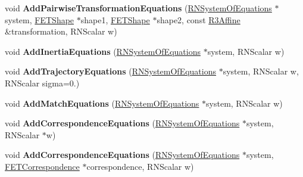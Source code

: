 \begin{DoxyCompactItemize}
\item 
void {\bfseries Add\+Pairwise\+Transformation\+Equations} (\hyperlink{class_r_n_system_of_equations}{R\+N\+System\+Of\+Equations} $\ast$system, \hyperlink{struct_f_e_t_shape}{F\+E\+T\+Shape} $\ast$shape1, \hyperlink{struct_f_e_t_shape}{F\+E\+T\+Shape} $\ast$shape2, const \hyperlink{class_r3_affine}{R3\+Affine} \&transformation, R\+N\+Scalar w)\hypertarget{struct_f_e_t_reconstruction_a228307ea59e871e44690954aef91dcab}{}\label{struct_f_e_t_reconstruction_a228307ea59e871e44690954aef91dcab}

\item 
void {\bfseries Add\+Inertia\+Equations} (\hyperlink{class_r_n_system_of_equations}{R\+N\+System\+Of\+Equations} $\ast$system, R\+N\+Scalar w)\hypertarget{struct_f_e_t_reconstruction_a45e427604577a2dfbdcc2c5d01559550}{}\label{struct_f_e_t_reconstruction_a45e427604577a2dfbdcc2c5d01559550}

\item 
void {\bfseries Add\+Trajectory\+Equations} (\hyperlink{class_r_n_system_of_equations}{R\+N\+System\+Of\+Equations} $\ast$system, R\+N\+Scalar w, R\+N\+Scalar sigma=0.)\hypertarget{struct_f_e_t_reconstruction_aa2b86a304ff0f7b397e0731e0c46071a}{}\label{struct_f_e_t_reconstruction_aa2b86a304ff0f7b397e0731e0c46071a}

\item 
void {\bfseries Add\+Match\+Equations} (\hyperlink{class_r_n_system_of_equations}{R\+N\+System\+Of\+Equations} $\ast$system, R\+N\+Scalar w)\hypertarget{struct_f_e_t_reconstruction_aa791df337940f01a2895ade1b8437b86}{}\label{struct_f_e_t_reconstruction_aa791df337940f01a2895ade1b8437b86}

\item 
void {\bfseries Add\+Correspondence\+Equations} (\hyperlink{class_r_n_system_of_equations}{R\+N\+System\+Of\+Equations} $\ast$system, R\+N\+Scalar $\ast$w)\hypertarget{struct_f_e_t_reconstruction_ae9d9c03b0acb5ef3f047ef544a86360c}{}\label{struct_f_e_t_reconstruction_ae9d9c03b0acb5ef3f047ef544a86360c}

\item 
void {\bfseries Add\+Correspondence\+Equations} (\hyperlink{class_r_n_system_of_equations}{R\+N\+System\+Of\+Equations} $\ast$system, \hyperlink{struct_f_e_t_correspondence}{F\+E\+T\+Correspondence} $\ast$correspondence, R\+N\+Scalar w)\hypertarget{struct_f_e_t_reconstruction_abfba83b0c385b20934cc91f9f99b74b7}{}\label{struct_f_e_t_reconstruction_abfba83b0c385b20934cc91f9f99b74b7}


\end{DoxyCompactItemize}
